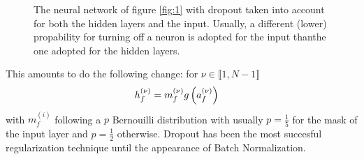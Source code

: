 \begin{figure}[H]
\begin{center}
\caption{\label{fig:2}The neural network of figure \ref{fig:1} with dropout taken into account for both the hidden layers and the input. Usually, a different (lower) propability for turning off a neuron is adopted for the input thanthe one adopted for the hidden layers.}
\end{center}
\end{figure}


This amounts to do the following change: for $\nu\in \llbracket 1,N-1\rrbracket$
\begin{align}
h^{(\nu)}_{f}=\null&m_f^{(\nu)} g\left(a_f^{(\nu)}\right)
\end{align}
with $m_f^{(i)}$ following a $p$ Bernouilli distribution with usually $p=\frac15$ for the mask of the input layer and $p=\frac12$ otherwise. Dropout\cite{Srivastava:2014:DSW:2627435.2670313} has been the most succesful regularization technique until the appearance of Batch Normalization. 

